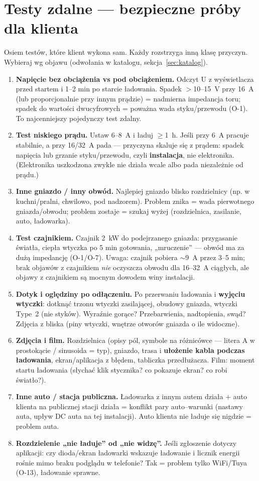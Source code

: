 \documentclass[11pt]{article}
\newcommand{\key}[1]{\textbf{\color{navy}#1}}
\begin{document}
\section{Testy zdalne — bezpieczne próby dla klienta}\label{sec:testy}
Osiem testów, które klient wykona sam. Każdy rozstrzyga inną klasę przyczyn. Wybieraj wg objawu (odwołania w katalogu, sekcja~\ref{sec:katalog}).

\begin{enumerate}[label=\textbf{T\arabic*.},leftmargin=2.6em]
\item \key{Napięcie bez obciążenia vs pod obciążeniem.} Odczyt U z wyświetlacza przed startem i 1--2 min po starcie ładowania. Spadek $>$10--15~V przy 16~A (lub proporcjonalnie przy innym prądzie) = nadmierna impedancja toru; spadek do wartości dwucyfrowych = poważna wada styku/przewodu (O-1). To najcenniejszy pojedynczy test zdalny.
\item \key{Test niskiego prądu.} Ustaw 6--8~A i ładuj $\geq$1~h. Jeśli przy 6~A pracuje stabilnie, a przy 16/32~A pada — przyczyna skaluje się z prądem: spadek napięcia lub grzanie styku/przewodu, czyli \key{instalacja}, nie elektronika. (Elektronika uszkodzona zwykle nie działa wcale albo pada niezależnie od prądu.)
\item \key{Inne gniazdo / inny obwód.} Najlepiej gniazdo blisko rozdzielnicy (np. w kuchni/pralni, chwilowo, pod nadzorem). Problem znika = wada pierwotnego gniazda/obwodu; problem zostaje = szukaj wyżej (rozdzielnica, zasilanie, auto, ładowarka).
\item \key{Test czajnikiem.} Czajnik 2~kW do podejrzanego gniazda: przygasanie światła, ciepła wtyczka po 5 min gotowania, „mruczenie'' — obwód ma za dużą impedancję (O-1/O-7). Uwaga: czajnik pobiera $\sim$9~A przez 3--5 min; brak objawów z czajnikiem \emph{nie} oczyszcza obwodu dla 16--32~A ciągłych, ale objawy z czajnikiem są mocnym dowodem winy instalacji.
\item \key{Dotyk i oględziny po odłączeniu.} Po przerwaniu ładowania i \key{wyjęciu wtyczki}: dotknąć trzonu wtyczki zasilającej, obudowy gniazda, wtyczki Type~2 (nie styków). Wyraźnie gorące? Przebarwienia, nadtopienia, swąd? Zdjęcia z bliska (piny wtyczki, wnętrze otworów gniazda o ile widoczne).
\item \key{Zdjęcia i film.} Rozdzielnica (opisy pól, symbole na różnicówce — litera A w prostokącie / sinusoida = typ), gniazdo, trasa i \key{ułożenie kabla podczas ładowania}, ekran/aplikacja z błędem, tabliczka przedłużacza. Film: moment startu ładowania (słychać klik stycznika? co pokazuje ekran? co robi światło?).
\item \key{Inne auto / stacja publiczna.} Ładowarka z innym autem działa + auto klienta na publicznej stacji działa = konflikt pary auto--warunki (nastawy auta, upływ DC auta na tej instalacji). Auto klienta nie ładuje się nigdzie = problem auta.
\item \key{Rozdzielenie „nie ładuje'' od „nie widzę''.} Jeśli zgłoszenie dotyczy aplikacji: czy dioda/ekran ładowarki wskazuje ładowanie i licznik energii rośnie mimo braku podglądu w telefonie? Tak = problem tylko WiFi/Tuya (O-13), ładowanie sprawne.
\end{enumerate}
\end{document}
